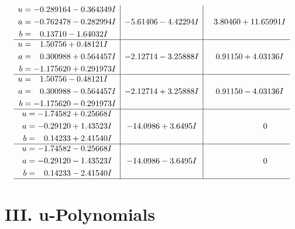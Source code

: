 \documentclass[1p]{elsarticle_modified}
\theoremstyle{definition}
\begin{document}
$$\begin{array}{c|c|c}
\begin{aligned}
u &= -0.289164 - 0.364349 I \\
a &= -0.762478 - 0.282994 I \\
b &= \phantom{-}0.13710 - 1.64032 I\end{aligned}
 & -5.61406 - 4.42294 I & \phantom{-}3.80460 + 11.65991 I \\ \hline\begin{aligned}
u &= \phantom{-}1.50756 + 0.48121 I \\
a &= \phantom{-}0.300988 + 0.564457 I \\
b &= -1.175620 + 0.291973 I\end{aligned}
 & -2.12714 - 3.25888 I & \phantom{-}0.91150 + 4.03136 I \\ \hline\begin{aligned}
u &= \phantom{-}1.50756 - 0.48121 I \\
a &= \phantom{-}0.300988 - 0.564457 I \\
b &= -1.175620 - 0.291973 I\end{aligned}
 & -2.12714 + 3.25888 I & \phantom{-}0.91150 - 4.03136 I \\ \hline\begin{aligned}
u &= -1.74582 + 0.25668 I \\
a &= -0.29120 + 1.43523 I \\
b &= \phantom{-}0.14233 + 2.41540 I\end{aligned}
 & -14.0986 + 3.6495 I & \phantom{-0.000000 } 0 \\ \hline\begin{aligned}
u &= -1.74582 - 0.25668 I \\
a &= -0.29120 - 1.43523 I \\
b &= \phantom{-}0.14233 - 2.41540 I\end{aligned}
 & -14.0986 - 3.6495 I & \phantom{-0.000000 } 0\\
 \hline 
 \end{array}$$\newpage
\newpage\renewcommand{\arraystretch}{1}
\centering \section*{ III. u-Polynomials}
\end{document}
